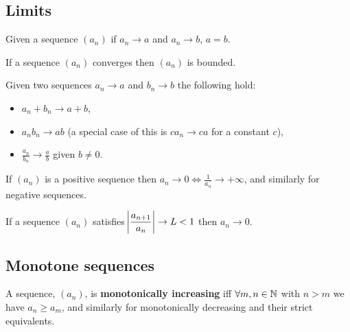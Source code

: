 \subsection{Limits}

\begin{theorem}
    Given a sequence $(a_n)$ if $a_n\rightarrow a$ and $a_n\rightarrow b$, $a=b$.
\end{theorem}

\begin{theorem}
    If a sequence $(a_n)$ converges then $(a_n)$ is bounded.
\end{theorem}

\begin{theorem}
    Given two sequences $a_n\rightarrow a$ and $b_n\rightarrow b$ the following hold: \begin{itemize}
        \item $a_n + b_n \rightarrow a + b$,
        \item $a_nb_n \rightarrow ab$ (a special case of this is $ca_n\rightarrow ca$ for a constant $c$),
        \item $\displaystyle{\frac{a_n}{b_n} \rightarrow \frac{a}{b}}$ given $b\neq0$.
    \end{itemize}
\end{theorem}

\vspace{-15pt}

\begin{theorem}
    If $(a_n)$ is a positive sequence then $a_n\rightarrow0\iff\displaystyle{\frac{1}{a_n}\rightarrow+\infty}$, and similarly for negative sequences.
\end{theorem}

\begin{theorem}
    If a sequence $(a_n)$ satisfies $\displaystyle \abs{\frac{a_{n+1}}{a_n}}\rightarrow L <1$ then $a_n\rightarrow0$.
\end{theorem}

\subsection{Monotone sequences}

\begin{definition}
    A sequence, $(a_n)$, is \textbf{monotonically increasing} iff $\forall m,n\in\mathbb{N}$ with $n>m$ we have $a_n\geq a_m$, and similarly for monotonically decreasing and their strict equivalents.
\end{definition}

